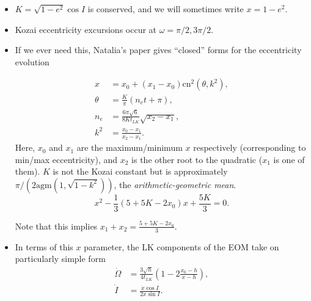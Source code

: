 \documentclass[11pt,
        usenames, %
        dvipsnames %
    ]{article}
\newcommand*{\p}[1]{\left(#1\right)}
\begin{document}
\begin{itemize}
    \item $K = \sqrt{1 - e^2}\cos I$ is conserved, and we will sometimes write
        $x = 1 - e^2$.

    \item Kozai eccentricity excursions occur at $\omega = \pi/2, 3\pi/2$.

    \item If we ever need this, Natalia's paper gives ``closed'' forms for the
        eccentricity evolution

        \begin{align}
            x &= x_0 + \p{x_1 - x_0}\mathrm{cn}^2(\theta, k^2),\\
            \theta &= \frac{K}{\pi}\p{n_e t + \pi},\\
            n_e &= \frac{6\pi \sqrt{6}}{8Kt_{LK}}\sqrt{x_2 - x_1},\\
            k^2 &= \frac{x_0 - x_1}{x_2 - x_1}.
        \end{align}
        Here, $x_0$ and $x_1$ are the maximum/minimum $x$ respectively
        (corresponding to min/max eccentricity), and $x_2$ is the other root to
        the quadratic ($x_1$ is one of them). $K$ is not the Kozai constant but
        is approximately $\pi / (2 \mathrm{agm}(1, \sqrt{1 - k^2}))$, the
        \emph{arithmetic-geometric mean}.
        \begin{equation}
            x^2 - \frac{1}{3}\p{5 + 5K - 2x_0}x + \frac{5K}{3} = 0.
        \end{equation}

        Note that this implies $x_1 + x_2 = \frac{5 + 5K - 2x_0}{3}$.

    \item In terms of this $x$ parameter, the LK components of the EOM
        take on particularly simple form
        \begin{align}
            \dot{\Omega} &= \frac{3\sqrt{h}}{4t_{LK}}\p{1 - 2\frac{x_0 - h}{x -
                h}},\\
            \dot{I} &= \frac{\dot{x} \cos I}{2x \sin I}.
        \end{align}
\end{itemize}
\end{document}
